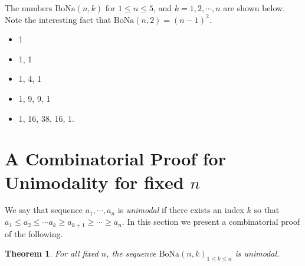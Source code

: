 \documentclass[11pt]{article}
\newcommand{\bona}{\mathrm{BoNa}}
\newtheorem{theorem}{Theorem}[section]
\begin{document}
The numbers $\bona(n,k)$ for $1\leq n\leq 5$, and $k=1,2,\cdots ,n$ are shown below. Note the interesting fact that $\bona(n,2)=(n-1)^2$.

\begin{itemize}
\item 1
\item 1, 1
\item 1, 4, 1
\item 1, 9, 9, 1
\item 1, 16, 38, 16, 1.
\end{itemize}

\section{A Combinatorial Proof for Unimodality for fixed $n$} \label{unimodal-hor}
We say that sequence $a_1,\cdots ,a_n$ is {\em unimodal} if there exists an index $k$ so that $a_1\leq a_2\leq \cdots a_k\geq a_{k+1} \geq \cdots \geq a_n$.
In this section we present a combinatorial proof of the following. 

\begin{theorem} \label{unimodaltheorem}
For all fixed $n$, the sequence $\bona(n,k)_{1\leq k \leq n}$ is
unimodal. 
\end{theorem}
\end{document}
